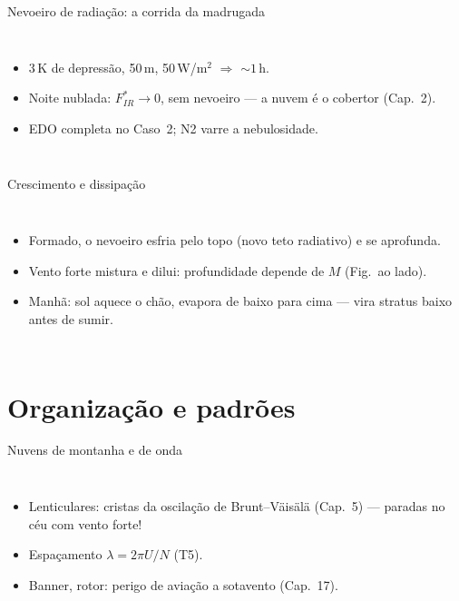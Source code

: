 \documentclass[aspectratio=169,11pt]{beamer}
\begin{document}
\begin{frame}{Nevoeiro de radiação: a corrida da madrugada}
  \begin{columns}
    \vspace{0.4em}
    \begin{itemize}
      \item $3$\,K de depressão, 50\,m, 50\,W/m$^2$ $\Rightarrow$
            $\sim1$\,h.
      \item Noite nublada: $F^*_{IR}\to0$, sem nevoeiro — a nuvem é o
            cobertor (Cap.~2).
      \item EDO completa no Caso~2; N2 varre a nebulosidade.
    \end{itemize}
  \end{columns}
\end{frame}

\begin{frame}{Crescimento e dissipação}
  \begin{columns}
    \begin{itemize}
      \item Formado, o nevoeiro esfria pelo \alert{topo} (novo teto
            radiativo) e se aprofunda.
      \item Vento forte mistura e dilui: profundidade depende de $M$
            (Fig.\ ao lado).
      \item Manhã: sol aquece o chão, evapora de baixo para cima —
            vira stratus baixo antes de sumir.
    \end{itemize}
  \end{columns}
\end{frame}

\section{Organização e padrões}

\begin{frame}{Nuvens de montanha e de onda}
  \begin{columns}
    \begin{itemize}
      \item Lenticulares: cristas da oscilação de Brunt--Väisälä
            (Cap.~5) — paradas no céu com vento forte!
      \item Espaçamento $\lambda = 2\pi U/N$ (T5).
      \item Banner, rotor: perigo de aviação a sotavento (Cap.~17).
    \end{itemize}
  \end{columns}
\end{frame}
\end{document}
